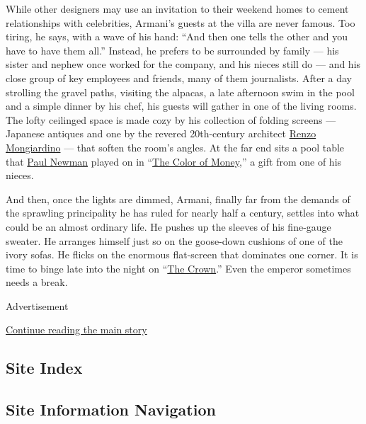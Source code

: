 While other designers may use an invitation to their weekend homes to
cement relationships with celebrities, Armani's guests at the villa are
never famous. Too tiring, he says, with a wave of his hand: ``And then
one tells the other and you have to have them all.'' Instead, he prefers
to be surrounded by family --- his sister and nephew once worked for the
company, and his nieces still do --- and his close group of key
employees and friends, many of them journalists. After a day strolling
the gravel paths, visiting the alpacas, a late afternoon swim in the
pool and a simple dinner by his chef, his guests will gather in one of
the living rooms. The lofty ceilinged space is made cozy by his
collection of folding screens --- Japanese antiques and one by the
revered 20th-century architect
\href{https://www.nytimes3xbfgragh.onion/2016/04/06/t-magazine/renzo-mongiardino-architect.html}{Renzo
Mongiardino} --- that soften the room's angles. At the far end sits a
pool table that
\href{https://www.nytimes3xbfgragh.onion/2008/09/28/movies/28newman.html}{Paul
Newman} played on in
``\href{https://www.nytimes3xbfgragh.onion/1986/10/17/movies/screen-paul-newman-in-the-color-of-money.html}{The
Color of Money},'' a gift from one of his nieces.

And then, once the lights are dimmed, Armani, finally far from the
demands of the sprawling principality he has ruled for nearly half a
century, settles into what could be an almost ordinary life. He pushes
up the sleeves of his fine-gauge sweater. He arranges himself just so on
the goose-down cushions of one of the ivory sofas. He flicks on the
enormous flat-screen that dominates one corner. It is time to binge late
into the night on
``\href{https://www.nytimes3xbfgragh.onion/2017/12/07/arts/television/the-crown-season-2-review.html?action=click\&contentCollection=Television\&module=RelatedCoverage\&region=EndOfArticle\&pgtype=article}{The
Crown}.'' Even the emperor sometimes needs a break.

Advertisement

\protect\hyperlink{after-bottom}{Continue reading the main story}

\hypertarget{site-index}{%
\subsection{Site Index}\label{site-index}}

\hypertarget{site-information-navigation}{%
\subsection{Site Information
Navigation}\label{site-information-navigation}}

